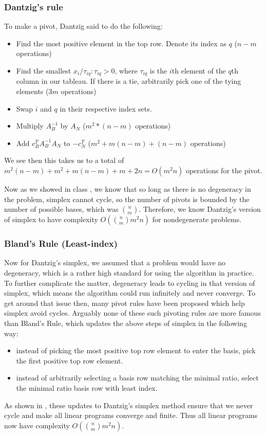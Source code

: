 \documentclass[11pt]{article}
\begin{document}
\subsubsection{Dantzig's rule}
To make a pivot, Dantzig said to do the following:
\begin{itemize}
	\item Find the most positive element in the top row. Denote its index as $q$ ($n-m$ operations)
	\item Find the smallest $x_i/ \tau_{iq} : \tau_{iq} > 0$, where $\tau_{iq}$ is the $i$th element of the $q$th column in our tableau. If there is a tie, arbitrarily pick one of the tying elements ($3m$ operations)
	\item Swap $i$ and $q$ in their respective index sets.
	\item Multiply $A_B^{-1}$ by $A_N$ ($m^2*(n-m)$ operations)
	\item Add $c_B^T A_B^{-1} A_N$ to $-c_N^T$ ($m^2 + m(n-m) + (n-m)$ operations)
\end{itemize}
We see then this takes us to a total of $m^2 (n - m) + m^2 + m (n - m) + m + 2 n = O(m^2n)$ operations for the pivot.

Now as we showed in class \cite{class}, we know that so long as there is no degeneracy in the problem, simplex cannot cycle, so the number of pivots is bounded by the number of possible bases, which was $\binom{n}{m}$. Therefore, we know Dantzig's version of simplex to have complexity $O(\binom{n}{m}m^2n)$ for nondegenerate problems.

\subsubsection{Bland's Rule (Least-index)}
Now for Dantzig's simplex, we assumed that a problem would have no degeneracy, which is a rather high standard for using the algorithm in practice. To further complicate the matter, degeneracy leads to cycling in that version of simplex, which means the algorithm could run infinitely and never converge. To get around that issue then, many pivot rules have been proposed which help simplex avoid cycles. Arguably none of these such pivoting rules are more famous than Bland's Rule, which updates the above steps of simplex in the following way:
\begin{itemize}
	\item instead of picking the most positive top row element to enter the basis, pick the first positive top row element.
	\item instead of arbitrarily selecting a basis row matching the minimal ratio, select the minimal ratio basis row with least index.
\end{itemize}
As shown in \cite{bland}, these updates to Dantzig's simplex method ensure that we never cycle and make all linear programs converge and finite. Thus all linear programs now have complexity $O(\binom{n}{m}m^2n)$.
\end{document}
